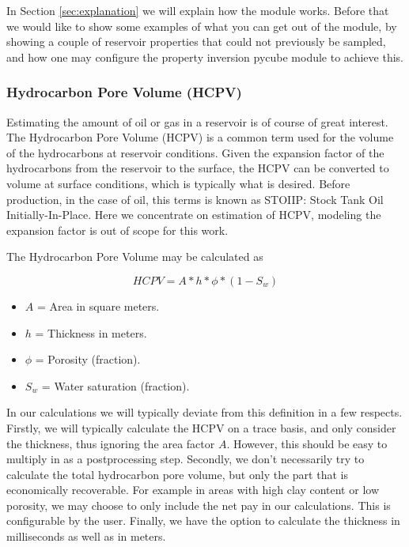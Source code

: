\documentclass[note,screen,english,12pt,utf8]{nrdoc}
\begin{document}
In Section \ref{sec:explanation} we will explain how the module works.
Before that we would like to show some examples of what you can
get out of the module, by showing a couple of reservoir
properties that could not previously be sampled, and how one
may configure the property inversion pycube module to achieve this.


\subsubsection{Hydrocarbon Pore Volume (HCPV)}

Estimating the amount of oil or gas in a reservoir is of course of great interest.
The Hydrocarbon Pore Volume (HCPV) is a common term used for the volume of the
hydrocarbons at reservoir conditions. Given the expansion factor of the hydrocarbons from the
reservoir to the surface, the HCPV can be converted to volume at surface
conditions, which is typically what is desired. Before production, in the
case of oil, this terms is known as STOIIP: Stock Tank Oil Initially-In-Place.
Here we concentrate on estimation of HCPV, modeling the expansion factor is out
of scope for this work.

The Hydrocarbon Pore Volume may be calculated as

\begin{equation}
HCPV = A * h * \phi * (1 - S_w)
\end{equation}

\begin{itemize}
    \item $A$ = Area in square meters.
    \item $h$ = Thickness in meters.
    \item $\phi$ = Porosity (fraction).
    \item $S_w$ = Water saturation (fraction).
\end{itemize}

In our calculations we will typically deviate from this definition in a few respects.
Firstly, we will typically calculate the HCPV on a trace basis, and only consider
the thickness, thus ignoring the area factor $A$. However, this should be easy to
multiply in as a postprocessing step.
Secondly, we don't necessarily try to calculate the total hydrocarbon
pore volume, but only the part that is economically recoverable. For example in areas
with high clay content or low porosity, we may choose to only include the net pay
in our calculations. This is configurable by the user.
Finally, we have the option to calculate the thickness in milliseconds as
well as in meters.
\end{document}
